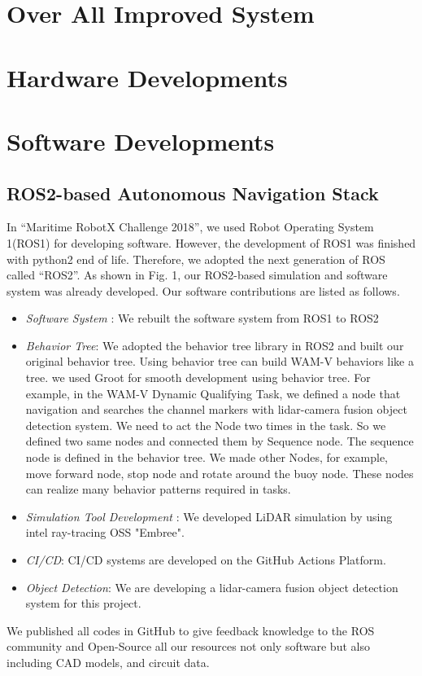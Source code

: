 \documentclass[lettersize,journal]{IEEEtran}
\begin{document}
\section{Over All Improved System}
\section{Hardware Developments}
\section{Software Developments}
\subsection{ROS2-based Autonomous Navigation Stack}
In “Maritime RobotX Challenge 2018”, we used Robot Operating System 1(ROS1) for developing software.
However, the development of ROS1 was finished with python2 end of life.
Therefore, we adopted the next generation of ROS called “ROS2”.
As shown in Fig. 1, our ROS2-based simulation and software system was already developed.
Our software contributions are listed as follows.

\begin{itemize}
  \item {\it Software System }:
    We rebuilt the software system from ROS1 to ROS2
  \item {\it Behavior Tree}:
  We adopted the behavior tree library in ROS2 and built our original behavior tree.
  Using behavior tree can build WAM-V behaviors like a tree.  
  we used Groot for smooth development using behavior tree. 
  For example, in the WAM-V Dynamic Qualifying Task, 
  we defined a node that navigation and searches the channel markers with lidar-camera fusion object detection system.
  We need to act the Node two times in the task. So we defined two same nodes and connected them by Sequence node. 
  The sequence node is defined in the behavior tree.
  We made other Nodes, for example, move forward node, stop node and rotate around the buoy node.
  These nodes can realize many behavior patterns required in tasks.
  
  \item {\it Simulation Tool Development }:
    We developed LiDAR simulation by using intel ray-tracing OSS "Embree".
  \item {\it CI/CD}:
    CI/CD systems are developed on the GitHub Actions Platform.
  \item {\it Object Detection}:
    We are developing a lidar-camera fusion object detection system for this project.
\end{itemize}
We published all codes in GitHub to give feedback knowledge to the ROS community and 
Open-Source all our resources not only software but also including CAD models, and circuit data.
\end{document}
